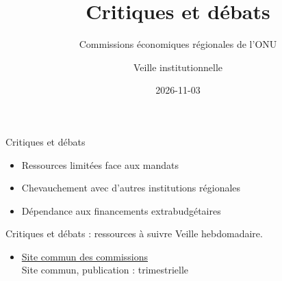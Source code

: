 \documentclass[aspectratio=169,11pt]{beamer}
\title{Critiques et débats}
\subtitle{Commissions économiques régionales de l'ONU}
\author{Veille institutionnelle}
\date{2026-11-03}
\begin{document}
\begin{frame}\titlepage\end{frame}

\begin{frame}{Critiques et débats}
\begin{itemize}
\item Ressources limitées face aux mandats
\item Chevauchement avec d'autres institutions régionales
\item Dépendance aux financements extrabudgétaires
\end{itemize}
\end{frame}

\begin{frame}{Critiques et débats : ressources à suivre}
\small
Veille hebdomadaire.
\begin{itemize}
\item \href{https://www.regionalcommissions.org}{Site commun des commissions}\\{\footnotesize Site commun, publication : trimestrielle}
\end{itemize}
\end{frame}
\end{document}
